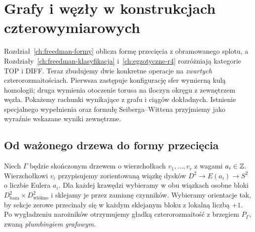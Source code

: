 \chapter{Grafy i węzły w konstrukcjach czterowymiarowych}
\label{ch:grafy-wezly-cztery}

Rozdział~\ref{ch:freedman-formy} oblicza formę przecięcia
z obramowanego splotu, a Rozdziały~\ref{ch:freedman-klasyfikacja}
i~\ref{ch:egzotyczne-r4} rozróżniają kategorie TOP i DIFF.
Teraz zbudujemy dwie konkretne operacje na \emph{zwartych}
czterorozmaitościach. Pierwsza zastępuje konfigurację sfer
wymierną kulą homologii; druga wymienia otoczenie torusa
na iloczyn okręgu z zewnętrzem węzła. Pokażemy rachunki
wynikające z grafu i ciągów dokładnych. Istnienie
specjalnego wypełnienia oraz formułę Seiberga--Wittena
przyjmiemy jako wyraźnie wskazane wyniki zewnętrzne.

\section{Od ważonego drzewa do formy przecięcia}
\label{sec:plumbing-graf-cztery}

Niech $\Gamma$ będzie skończonym drzewem o wierzchołkach
$v_1,\ldots,v_r$ z wagami $a_i\in\mathbb{Z}$. Wierzchołkowi
$v_i$ przypisujemy zorientowaną wiązkę dysków
$D^2\to E(a_i)\to S^2$ o liczbie Eulera $a_i$.
Dla każdej krawędzi wybieramy w obu wiązkach osobne
bloki $D^2_{\text{baza}}\times D^2_{\text{włókno}}$ i sklejamy
je przez zamianę czynników. Wybieramy orientacje tak,
by sekcje zerowe przecinały się w każdym sklejanym
bloku z lokalną liczbą $+1$. Po wygładzeniu narożników
otrzymujemy gładką czterorozmaitość z brzegiem
$P_\Gamma$, zwaną \emph{plumbingiem grafowym}.

